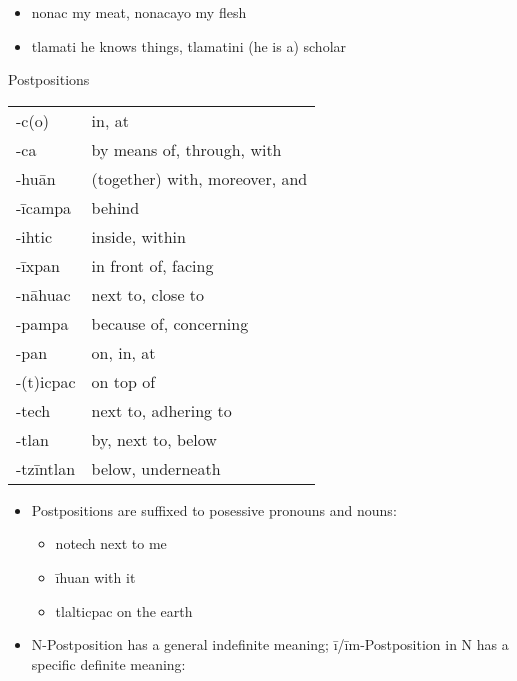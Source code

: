 \documentclass[12pt]{beamer}
\newcommand{\nah}[1]{\textcolor{nahgrn}{#1}}
\newcommand{\trs}[1]{\textcolor{nahblu}{#1}}
\begin{document}
\begin{frame}
\begin{columns}[t]
\begin{column}{.20\linewidth}
\begin{example}
\begin{itemize}
      		\item \nah{nonac} \trs{my meat}, \nah{nonacayo} \trs{my flesh}
      		\item \nah{tlamati} \trs{he knows things}, \nah{tlamatini} \trs{(he is a) scholar}
      	\end{itemize}
      \end{example}
      \begin{block}{Postpositions}
        \begin{tabular}{ll}
          \nah{-c(o)}     & \trs{in, at}                         \\
          \nah{-ca}       & \trs{by means of, through, with}     \\
          \nah{-huān}     & \trs{(together) with, moreover, and} \\
          \nah{-īcampa}   & \trs{behind}                         \\
          \nah{-ihtic}    & \trs{inside, within}                 \\
          \nah{-īxpan}    & \trs{in front of, facing}            \\
          \nah{-nāhuac}   & \trs{next to, close to}              \\
          \nah{-pampa}    & \trs{because of, concerning}         \\
          \nah{-pan}      & \trs{on, in, at}                     \\
          \nah{-(t)icpac} & \trs{on top of}                      \\
          \nah{-tech}     & \trs{next to, adhering to}           \\
          \nah{-tlan}     & \trs{by, next to, below}             \\
          \nah{-tzīntlan} & \trs{below, underneath}              \\
        \end{tabular}%
        \begin{itemize}
          \item Postpositions are suffixed to posessive pronouns and nouns:
                \begin{itemize}
                  \item \nah{notech} \trs{next to me}
                  \item \nah{īhuan} \trs{with it}
                  \item \nah{tlalticpac} \trs{on the earth}
                \end{itemize}
          \item N-Postposition has a general indefinite meaning; \nah{ī/īm}-Postposition \nah{in} N has a specific definite meaning:

\end{itemize}
\end{block}
\end{column}
\end{columns}
\end{frame}
\end{document}
